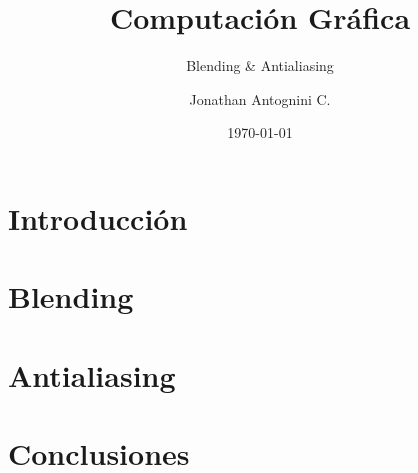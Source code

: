\documentclass{beamer}
\title{Computación Gráfica}
\subtitle{Blending \& Antialiasing}
\author{Jonathan Antognini C.
}
\institute[]{Universidad Técnica Federico Santa María}
\date{\today}
\begin{document}
    \frame{\titlepage}
    \frame{\tableofcontents}
	\newpage
	\section{Introducción}
		
	
	\newpage
	\section{Blending}
		

	\newpage
	\section{Antialiasing}
		
	
	\newpage
	\section{Conclusiones}
		
\end{document}
